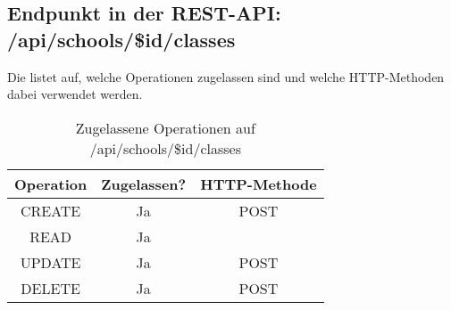 \subsection{Endpunkt in der REST-API: /api/schools/\$id/classes}
Die  listet auf, welche Operationen zugelassen sind und welche HTTP-Methoden dabei verwendet werden. 

\begin{table}[!htbp]
	\begin{tabular}{|c|c|c|}
		\hline
			\textbf{Operation} & \textbf{Zugelassen?} & \textbf{HTTP-Methode} \\ \hline
			CREATE & Ja & POST \\ \hline 
			READ & Ja &  \\ \hline
			UPDATE & Ja & POST \\ \hline 
			DELETE & Ja & POST \\ \hline
	\end{tabular}

		\caption{Zugelassene Operationen auf /api/schools/\$id/classes}
		\label{tab:end:rest:api:schools:id:classes:meth}
\end{table}
